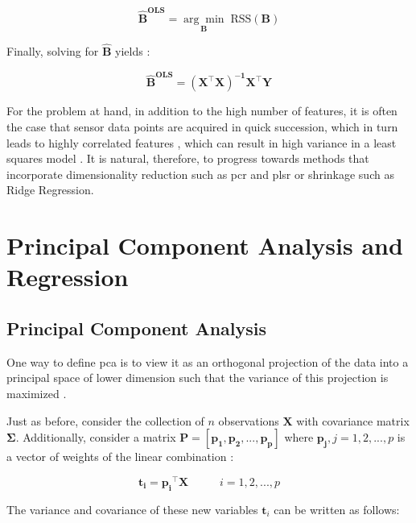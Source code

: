 \begin{equation}
	\label{eqn:betahat}
	\mathbf{\hat{B}^\text{OLS}} = \underset{\mathbf{B}}{\arg\min} 	\; \text{RSS}(\mathbf{B})
\end{equation}

Finally, solving for $\mathbf{\hat{B}}$ yields \parencite{friedman2001}:

\begin{equation}
	\label{eqn:ols_beta}
	\mathbf{\hat{B}^\text{OLS}} = \mathbf{(X^\intercal X)^{-1} X^\intercal Y}
\end{equation}

For the problem at hand, in addition to the high number of features, it is often the case that sensor data points are acquired in quick succession, which in turn leads to highly correlated features \parencite{Bastuck_2019}, which can result in high variance in a least squares model \parencite{friedman2001}. It is natural, therefore, to progress towards methods that incorporate dimensionality reduction such as \acrfull{pcr} and \acrfull{plsr} or shrinkage such as Ridge Regression.

\section{Principal Component Analysis and Regression}
\label{sec:pca}

\subsection{Principal Component Analysis}

One way to define \acrfull{pca} is to view it as an orthogonal projection of the data into a principal space of lower dimension such that the variance of this projection is maximized \parencite{bishop2006pattern}.

Just as before, consider the  collection of $n$ observations  $\mathbf{X}$ with covariance matrix $\mathbf{\Sigma}$. Additionally, consider a matrix $\mathbf{P = [p_1, p_2, ..., p_p]}$ where $\mathbf{p_j}, j=1,2,...,p$ is a vector of weights of the linear combination \parencite{johnson2013applied}:

\begin{equation}
	\label{eqn:pca-lincomb}
	\mathbf{t_i}=\mathbf{p_i}^\intercal \mathbf{X} \;\;\;\;\;\;\;\;\;\; i = 1, 2, ..., p
\end{equation}

The variance and covariance of these new variables $\mathbf{t}_i$ can be written as follows:

